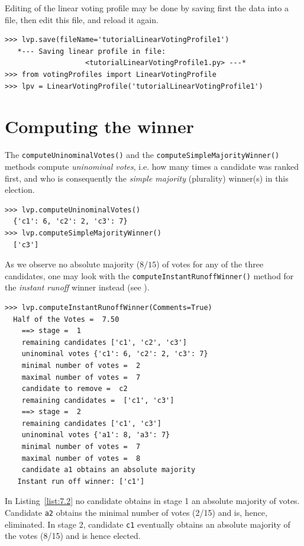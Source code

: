 Editing of the linear voting profile may be done by saving first the data into a file, then edit this file, and reload it again.
\begin{lstlisting}
>>> lvp.save(fileName='tutorialLinearVotingProfile1')
   *--- Saving linear profile in file:
                   <tutorialLinearVotingProfile1.py> ---*
>>> from votingProfiles import LinearVotingProfile
>>> lpv = LinearVotingProfile('tutorialLinearVotingProfile1')
\end{lstlisting}

\section{Computing the winner}
\label{sec:7.2}

The \texttt{computeUninominalVotes()} and the \texttt{computeSimpleMajority\-Winner()} methods compute \emph{uninominal votes}, i.e. how many times a candidate was ranked first, and who is consequently the \emph{simple majority} (plurality) winner(s) in this election.
\begin{lstlisting}
>>> lvp.computeUninominalVotes()
  {'c1': 6, 'c2': 2, 'c3': 7}
>>> lvp.computeSimpleMajorityWinner()
  ['c3']
\end{lstlisting}

As we observe no absolute majority ($8/15$) of votes for any of the three candidates, one may look with the \texttt{computeInstantRunoffWinner()} method for the \emph{instant runoff} winner instead (see \citet{ADT-L2}).
\begin{lstlisting}[caption={Example Instant Run Off Winner},label=list:7.2]
>>> lvp.computeInstantRunoffWinner(Comments=True)
  Half of the Votes =  7.50
    ==> stage =  1
	remaining candidates ['c1', 'c2', 'c3']
	uninominal votes {'c1': 6, 'c2': 2, 'c3': 7}
	minimal number of votes =  2
	maximal number of votes =  7
	candidate to remove =  c2
	remaining candidates =  ['c1', 'c3']
    ==> stage =  2
	remaining candidates ['c1', 'c3']
	uninominal votes {'a1': 8, 'a3': 7}
	minimal number of votes =  7
	maximal number of votes =  8
	candidate a1 obtains an absolute majority
   Instant run off winner: ['c1']
 \end{lstlisting}

In Listing~\vref{list:7.2} no candidate obtains in stage 1 an absolute majority of votes. Candidate \texttt{a2} obtains the minimal number of votes (2/15) and is, hence, eliminated. In stage 2, candidate \texttt{c1} eventually obtains an absolute majority of the votes (8/15) and is hence elected.

